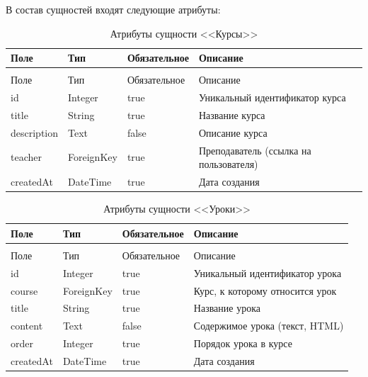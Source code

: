 В состав сущностей входят следующие атрибуты:

\begin{xltabular}{\textwidth}{|l|l|p{3.2cm}|X|}
  \caption{Атрибуты сущности <<Курсы>>\label{courses:table}}\\ \hline
  Поле & Тип & Обязательное & Описание \\ \hline
  \endfirsthead
  \\ \hline
  Поле & Тип & Обязательное & Описание \\ \hline
  \endhead
  id & Integer & true & Уникальный идентификатор курса \\ \hline
  title & String & true & Название курса \\ \hline
  description & Text & false & Описание курса \\ \hline
  teacher & ForeignKey & true & Преподаватель (ссылка на пользователя) \\ \hline
  createdAt & DateTime & true & Дата создания \\ \hline
\end{xltabular}

\begin{xltabular}{\textwidth}{|l|l|p{3.2cm}|X|}
  \caption{Атрибуты сущности <<Уроки>>\label{lessons:table}}\\ \hline
  Поле & Тип & Обязательное & Описание \\ \hline
  \endfirsthead
  \\ \hline
  Поле & Тип & Обязательное & Описание \\ \hline
  \endhead
  id & Integer & true & Уникальный идентификатор урока \\ \hline
  course & ForeignKey & true & Курс, к которому относится урок \\ \hline
  title & String & true & Название урока \\ \hline
  content & Text & false & Содержимое урока (текст, HTML) \\ \hline
  order & Integer & true & Порядок урока в курсе \\ \hline
  createdAt & DateTime & true & Дата создания \\ \hline
\end{xltabular}

